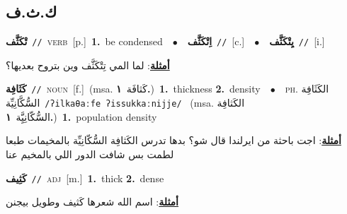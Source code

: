 \documentclass[10pt,a4paper,twoside]{article} %
\begin{document}
\begin{multicols}{2}
\vspace{-3mm}
\subsection*{\color{blue}\foreignlanguage{arabic}{ك.ث.ف}\color{blue}{}} 

{\setlength\topsep{0pt}\textbf{\foreignlanguage{arabic}{تْكَثَّف}}\ {\color{gray}\texttt{//}\color{black}}\ \textsc{verb}\ [p.]\ \textbf{1.}~be condensed\ \ $\bullet$\ \ \setlength\topsep{0pt}\textbf{\foreignlanguage{arabic}{اِتْكَثَّف}}\ {\color{gray}\texttt{//}\color{black}}\ [c.]\ \ $\bullet$\ \ \setlength\topsep{0pt}\textbf{\foreignlanguage{arabic}{يِتْكَثَّف}}\ {\color{gray}\texttt{//}\color{black}}\ [i.]\  \begin{flushright}\color{gray}\foreignlanguage{arabic}{\textbf{\underline{\foreignlanguage{arabic}{أمثلة}}}: لما المي تِتْكَثَّف وين بتروح بعديها؟}\end{flushright}\color{black}} \vspace{2mm}

{\setlength\topsep{0pt}\textbf{\foreignlanguage{arabic}{كَثَافِة}}\ {\color{gray}\texttt{//}\color{black}}\ \textsc{noun}\ [f.]\ \color{gray}(msa. \foreignlanguage{arabic}{كَثافَة}~\foreignlanguage{arabic}{\textbf{١.}})\color{black}\ \textbf{1.}~thickness  \textbf{2.}~density\ \ $\bullet$\ \ \textsc{ph.} \color{gray} \foreignlanguage{arabic}{الكَثَافِة السُّكَّانِيِّة}\color{black}\ {\color{gray}\texttt{/{\sffamily ʔilkaθaːfe ʔissukkaːnijje}/}\color{black}}\ \color{gray} (msa. \foreignlanguage{arabic}{الكَثافِة السُّكّانِيَِّة}~\foreignlanguage{arabic}{\textbf{١.}})\color{black}\ \textbf{1.}~population density\  \begin{flushright}\color{gray}\foreignlanguage{arabic}{\textbf{\underline{\foreignlanguage{arabic}{أمثلة}}}: اجت باحثة من ايرلندا قال شو؟ بدها تدرس الكَثافِة السُّكّانِيِّة بالمخيمات طبعا لطمت بس شافت الدور اللي بالمخيم عنا}\end{flushright}\color{black}} \vspace{2mm}

{\setlength\topsep{0pt}\textbf{\foreignlanguage{arabic}{كَثِيف}}\ {\color{gray}\texttt{//}\color{black}}\ \textsc{adj}\ [m.]\ \textbf{1.}~thick  \textbf{2.}~dense\  \begin{flushright}\color{gray}\foreignlanguage{arabic}{\textbf{\underline{\foreignlanguage{arabic}{أمثلة}}}: اسم الله شعرها كَثيف وطويل بيجنن}\end{flushright}\color{black}} \vspace{2mm}


\end{multicols}
\end{document}
